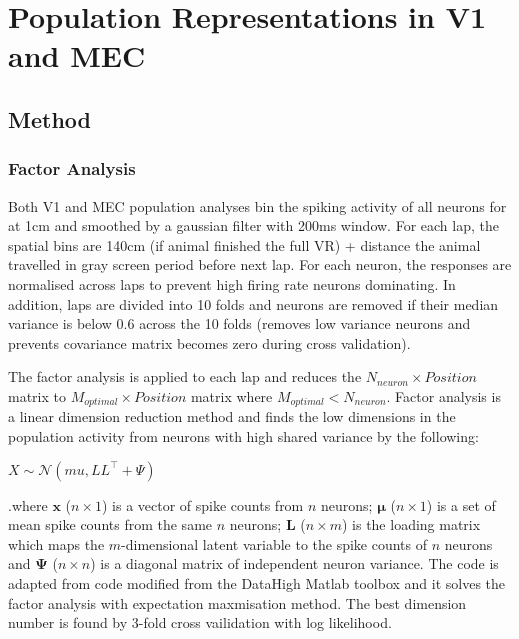 \chapter{Population Representations in V1 and MEC}
\label{chapterlabel6}



\section{Method}
\subsection{Factor Analysis}
Both V1 and MEC population analyses bin the spiking activity of all neurons for at 1cm and smoothed by a gaussian filter with 200ms window. For each lap, the spatial bins are 140cm (if animal finished the full VR) + distance the animal travelled in gray screen period before next lap. For each neuron, the responses are normalised across laps to prevent high firing rate neurons dominating. In addition, laps are divided into 10 folds and neurons are removed if their median variance is below 0.6 across the 10 folds (removes low variance neurons and prevents covariance matrix becomes zero during cross validation).

The factor analysis is applied to each lap and reduces the \(N_{neuron} \times Position\) matrix to \(M_{optimal} \times Position\) matrix where \(M_{optimal} < N_{neuron}\). Factor analysis is a linear dimension reduction method and finds the low dimensions in the population activity from neurons with high shared variance by the following:

\(X \sim \mathcal{N}(mu, LL^\top + \Psi)\)

.where $\mathbf{x}$ ($n \times 1$) is a vector of spike counts from $n$ neurons; $\boldsymbol{\mu}$ ($n \times 1$) is a set of mean spike counts from the same $n$ neurons; $\mathbf{L}$ ($n \times m$) is the loading matrix which maps the $m$-dimensional latent variable to the spike counts of $n$ neurons and $\boldsymbol{\Psi}$ ($n \times n$) is a diagonal matrix of independent neuron variance. The code is adapted from code modified from the DataHigh Matlab toolbox and it solves the factor analysis with expectation maxmisation method. The best dimension number is found by 3-fold cross vailidation with log likelihood.